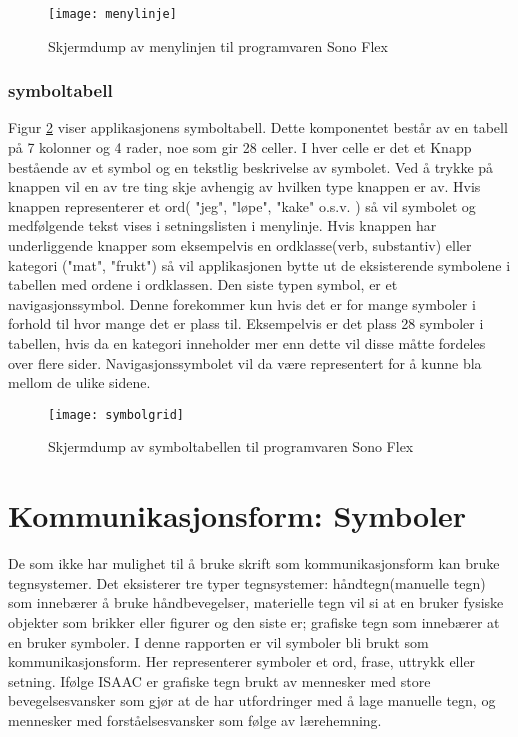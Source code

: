 \begin{figure}[ht!]
\centering
\texttt{[image: menylinje]}
\caption{Skjermdump av menylinjen til programvaren Sono Flex}
\label{fig:menylinje}
\end{figure}


\subsubsection{symboltabell}
\label{subsubsec:symboltabell}

Figur \ref{fig:symbolgrid} viser applikasjonens symboltabell. Dette komponentet består av en tabell på 7 kolonner og 4 rader,  noe som gir 28 celler. I hver celle er det et Knapp bestående av et symbol og en tekstlig beskrivelse av symbolet. Ved å trykke på knappen vil en av tre ting skje avhengig av hvilken type knappen er av. Hvis knappen representerer et ord( "jeg",  "løpe",  "kake" o.s.v. ) så vil symbolet og medfølgende tekst vises i setningslisten i menylinje.  Hvis knappen har underliggende knapper som eksempelvis en ordklasse(verb,  substantiv)  eller kategori ("mat",  "frukt") så vil applikasjonen bytte ut de eksisterende symbolene i tabellen med ordene i ordklassen. Den siste typen symbol, er et navigasjonssymbol. Denne forekommer kun hvis det er for mange symboler i forhold til hvor mange det er plass til. Eksempelvis er det plass 28 symboler i tabellen, hvis da en kategori inneholder mer enn dette vil disse måtte fordeles over flere sider. Navigasjonssymbolet vil da være representert for å kunne bla mellom de ulike sidene.


\begin{figure}[ht!]
\centering
\texttt{[image: symbolgrid]}
\caption{Skjermdump av symboltabellen til programvaren Sono Flex}
\label{fig:symbolgrid}
\end{figure}


\section{Kommunikasjonsform: Symboler}

De som ikke har mulighet til å bruke skrift som kommunikasjonsform kan bruke tegnsystemer. Det eksisterer tre typer tegnsystemer: håndtegn(manuelle tegn) som innebærer å bruke håndbevegelser, materielle tegn vil si at en bruker fysiske objekter som brikker eller figurer og den siste er; grafiske tegn som innebærer at en bruker symboler. I denne rapporten er vil symboler bli brukt som kommunikasjonsform. Her representerer symboler et ord, frase, uttrykk eller setning. Ifølge ISAAC \cite{Tegnsystemer} er grafiske tegn brukt av mennesker med store bevegelsesvansker som gjør at de har utfordringer med å lage manuelle tegn, og mennesker med forståelsesvansker som følge av lærehemning.

